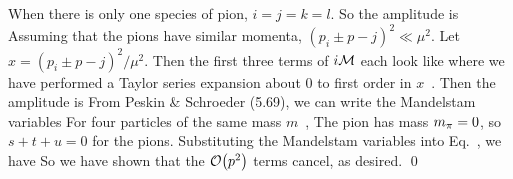 \documentclass[11pt]{article}
\begin{document}
{	When there is only one species of pion, $i = j = k = l$.  So the amplitude is
	Assuming that the pions have similar momenta, $(p_i \pm p-j)^2 \ll \mu^2$.  Let $x = (p_i \pm p-j)^2 / \mu^2$.  Then the first three terms of $i \mathcal{M}$ each look like
	where we have performed a Taylor series expansion about 0 to first order in $x$~\cite{Maclaurin}.  Then the amplitude is
	From Peskin \& Schroeder (5.69), we can write the Mandelstam variables
	For four particles of the same mass $m$~\cite[p.~159]{Peskin},
	The pion has mass $m_\pi = 0$, so $s + t + u = 0$ for the pions.  Substituting the Mandelstam variables into Eq.~, we have
	So we have shown that the $\order{p^2}$ terms cancel, as desired. \qed
}









\end{document}
